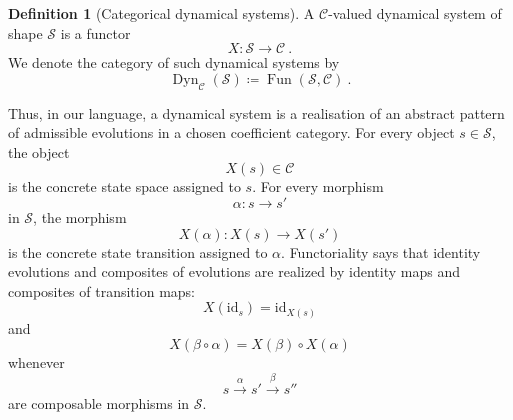 \documentclass[a4paper,reqno,oneside]{amsart}
\theoremstyle{definition}
\newtheorem{definition}[theorem]{Definition}
\theoremstyle{remark}
\newcommand{\id}{\mathrm{id}}
\numberwithin{equation}{section}
\begin{document}
	\begin{definition}[Categorical dynamical systems]\label{def: dynamical system}
		A $\mathcal C$-valued dynamical system of shape $\mathcal S$ is a functor
		\begin{equation}
			X \colon \mathcal S\longrightarrow \mathcal C \ .
		\end{equation}
		We denote the category of such dynamical systems by
		\begin{equation}
			\operatorname{Dyn}_{\mathcal C}(\mathcal S)
			\coloneqq
			\operatorname{Fun}(\mathcal S,\mathcal C) \ .
		\end{equation}
	\end{definition}
	
	Thus, in our language, a dynamical system is a realisation of an abstract
	pattern of admissible evolutions in a chosen coefficient category. For every
	object $s\in\mathcal S$, the object
	\begin{equation}
		X(s)\in\mathcal C
	\end{equation}
	is the concrete state space assigned to $s$. For every morphism
	\begin{equation}
		\alpha\colon s\to s'
	\end{equation}
	in $\mathcal S$, the morphism
	\begin{equation}
		X(\alpha)\colon X(s)\longrightarrow X(s')
	\end{equation}
	is the concrete state transition assigned to $\alpha$. Functoriality says
	that identity evolutions and composites of evolutions are realized by
	identity maps and composites of transition maps:
	\begin{equation}
		X(\id_s)=\id_{X(s)}
	\end{equation}
	and
	\begin{equation}
		X(\beta\circ\alpha)=X(\beta)\circ X(\alpha)
	\end{equation}
	whenever
	\begin{equation}
		s\xrightarrow{\alpha}s'\xrightarrow{\beta}s''
	\end{equation}
	are composable morphisms in $\mathcal S$.
	
	
	
\end{document}
